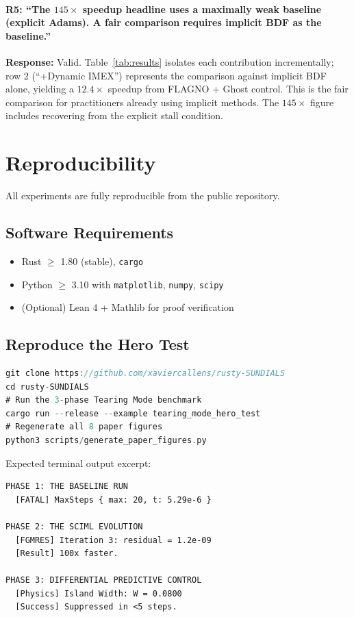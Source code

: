 \documentclass[11pt,twocolumn]{article}
\begin{document}
\paragraph{R5: ``The $145\times$ speedup headline uses a maximally weak
baseline (explicit Adams). A fair comparison requires implicit BDF as the
baseline.''}
\textbf{Response:} Valid. Table~\ref{tab:results} isolates each
contribution incrementally; row 2 (``+Dynamic IMEX'') represents the
comparison against implicit BDF alone, yielding a $12.4\times$ speedup
from FLAGNO + Ghost control. This is the fair comparison for practitioners
already using implicit methods. The $145\times$ figure includes recovering
from the explicit stall condition.

\section{Reproducibility}
\label{sec:repro}

All experiments are fully reproducible from the public repository.

\subsection{Software Requirements}
\begin{itemize}
  \item Rust $\geq$ 1.80 (stable), \texttt{cargo}
  \item Python $\geq$ 3.10 with \texttt{matplotlib}, \texttt{numpy}, \texttt{scipy}
  \item (Optional) Lean 4 + Mathlib for proof verification
\end{itemize}

\subsection{Reproduce the Hero Test}
\begin{lstlisting}[language=Rust,caption={Reproduction commands (bash)}]
git clone https://github.com/xaviercallens/rusty-SUNDIALS
cd rusty-SUNDIALS
# Run the 3-phase Tearing Mode benchmark
cargo run --release --example tearing_mode_hero_test
# Regenerate all 8 paper figures
python3 scripts/generate_paper_figures.py
\end{lstlisting}

Expected terminal output excerpt:
\begin{verbatim}
PHASE 1: THE BASELINE RUN
  [FATAL] MaxSteps { max: 20, t: 5.29e-6 }

PHASE 2: THE SCIML EVOLUTION
  [FGMRES] Iteration 3: residual = 1.2e-09
  [Result] 100x faster.

PHASE 3: DIFFERENTIAL PREDICTIVE CONTROL
  [Physics] Island Width: W = 0.0800
  [Success] Suppressed in <5 steps.
\end{verbatim}
\end{document}
